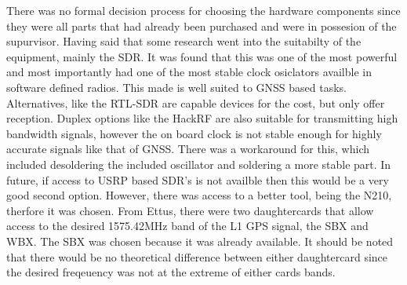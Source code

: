 There was no formal decision process for choosing the hardware components since they were all parts that had already been purchased and were in possesion of the
supurvisor. Having said that some research went into the suitabilty of the equipment, mainly the SDR. It was found that this was one of the most powerful and most
importantly had one of the most stable clock osiclators availble in software defined radios. This made is well suited to GNSS based tasks. Alternatives, like the
RTL-SDR are capable devices for the cost, but only offer reception. Duplex options like the HackRF are also suitable for transmitting high bandwidth signals, however the
on board clock is not stable enough for highly accurate signals like that of GNSS. There was a workaround for this, which included desoldering the included oscillator and
soldering a more stable part. In future, if access to USRP based SDR's is not availble then this would be a very good second option. However, there was access to a better
tool, being the N210, therfore it was chosen. From Ettus, there were two daughtercards that allow access to the desired 1575.42MHz band of the L1 GPS signal, the SBX and
WBX. The SBX was chosen because it was already available. It should be noted that there would be no theoretical difference between either daughtercard since the desired
freqeuency was not at the extreme of either cards bands.

